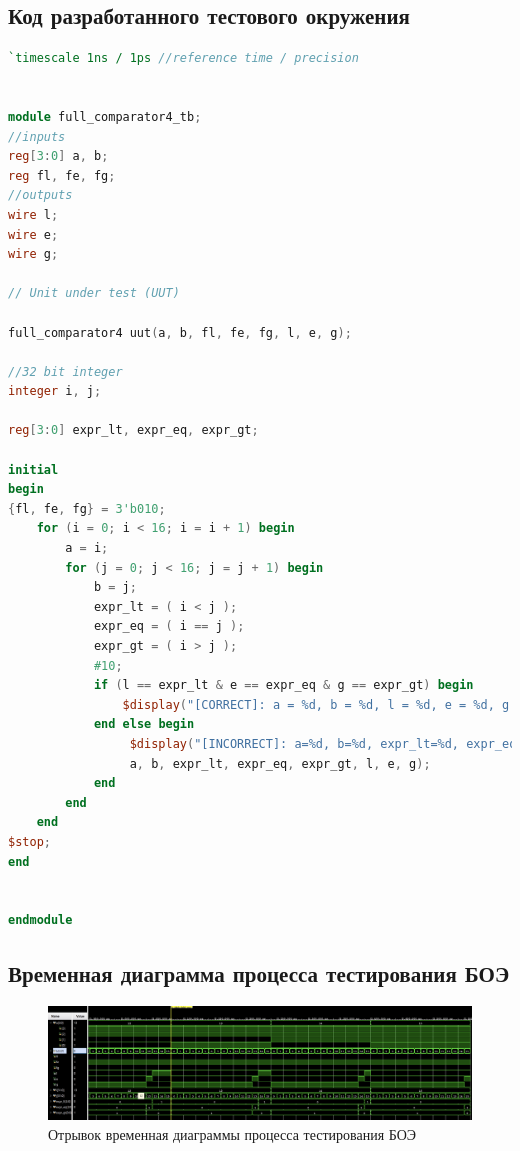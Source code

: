 \documentclass[12pt,onecolumn]{article}
\begin{document}
\subsection{Код разработанного тестового окружения}
\begin{lstlisting}[style=verilog, language=Verilog]
`timescale 1ns / 1ps //reference time / precision


module full_comparator4_tb;
//inputs
reg[3:0] a, b;
reg fl, fe, fg;
//outputs
wire l;
wire e;
wire g;

// Unit under test (UUT)

full_comparator4 uut(a, b, fl, fe, fg, l, e, g);

//32 bit integer
integer i, j;

reg[3:0] expr_lt, expr_eq, expr_gt;

initial
begin
{fl, fe, fg} = 3'b010;
    for (i = 0; i < 16; i = i + 1) begin
        a = i;
        for (j = 0; j < 16; j = j + 1) begin
            b = j;
            expr_lt = ( i < j );
            expr_eq = ( i == j );
            expr_gt = ( i > j );
            #10;
            if (l == expr_lt & e == expr_eq & g == expr_gt) begin
                $display("[CORRECT]: a = %d, b = %d, l = %d, e = %d, g = %d", a, b, l, e, g);
            end else begin
                 $display("[INCORRECT]: a=%d, b=%d, expr_lt=%d, expr_eq=%d, expr_gt=%d, l=%d, e=%d, g=%d",
                 a, b, expr_lt, expr_eq, expr_gt, l, e, g);
            end
        end
    end
$stop;
end


endmodule

\end{lstlisting}

\subsection{Временная диаграмма процесса тестирования БОЭ}
\begin{figure}[H]
    \centering
    \includegraphics[width=\textwidth]{image/verilog-diagram.png}
    \caption{Отрывок временная диаграммы процесса тестирования БОЭ}
\end{figure}
\end{document}
